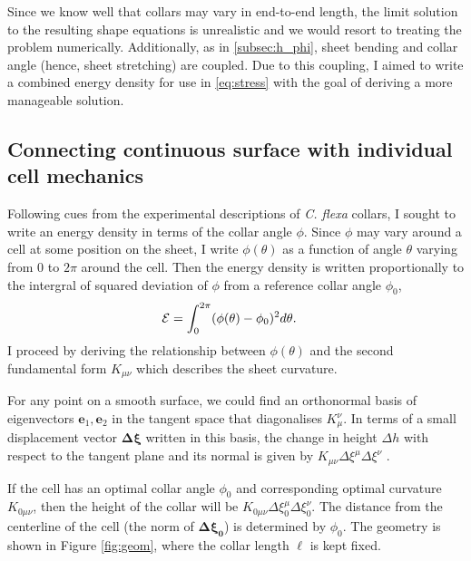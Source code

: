 Since we know well that collars may vary in end-to-end length, the limit solution to the resulting shape equations is unrealistic and we would resort to treating the problem numerically.
Additionally, as in \cref{subsec:h_phi}, sheet bending and collar angle (hence, sheet stretching) are coupled. 
Due to this coupling, I aimed to write a combined energy density for use in \cref{eq:stress} with the goal of deriving a more manageable solution.

\subsection{Connecting continuous surface with individual cell mechanics}

Following cues from the experimental descriptions of \textit{C. flexa} collars, I sought to write an energy density in terms of the collar angle $\phi$. 
Since $\phi$ may vary around a cell at some position on the sheet, I write $\phi(\theta)$ as a function of angle $\theta$ varying from $0$ to $2\pi$ around the cell.
Then the energy density is written proportionally to the intergral of squared deviation of $\phi$ from a reference collar angle $\phi_0$,
\begin{align}
	\mathcal{E} &= \int_0^{2\pi} (\phi(\theta) - \phi_0)^2 d\theta. \label{eq:phi_int}
\end{align}
I proceed by deriving the relationship between $\phi(\theta)$ and the second fundamental form $K_{\mu\nu}$ which describes the sheet curvature.

For any point on a smooth surface, we could find an orthonormal basis of eigenvectors $\bm{e}_1, \bm{e}_2$ in the tangent space that diagonalises $K_\mu^\nu$. 
In terms of a small displacement vector $\bm{\Delta \xi}$ written in this basis, the change in height $\Delta h$ with respect to the tangent plane and its normal is given by $K_{\mu\nu}\Delta\xi^\mu\Delta\xi^\nu$ \citep{powers2010}.

If the cell has an optimal collar angle $\phi_0$ and corresponding optimal curvature $K_{0\mu\nu}$, then the height of the collar will be $K_{0\mu\nu}\Delta\xi_0^\mu\Delta\xi_0^\nu$. 
The distance from the centerline of the cell (the norm of $\bm{\Delta\xi_0}$) is determined by $\phi_0$. The geometry is shown in Figure \ref{fig:geom}, where the collar length $\ell$ is kept fixed.


